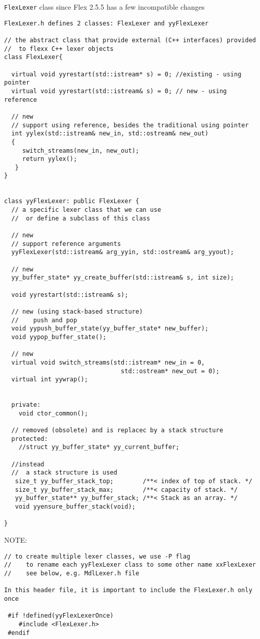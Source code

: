 \verb!FlexLexer! class since Flex 2.5.5 has a few incompatible changes
\begin{verbatim}
FlexLexer.h defines 2 classes: FlexLexer and yyFlexLexer

// the abstract class that provide external (C++ interfaces) provided
//  to flexx C++ lexer objects
class FlexLexer{

  virtual void yyrestart(std::istream* s) = 0; //existing - using pointer
  virtual void yyrestart(std::istream& s) = 0; // new - using reference
  
  // new
  // support using reference, besides the traditional using pointer
  int yylex(std::istream& new_in, std::ostream& new_out)
  {
     switch_streams(new_in, new_out);
     return yylex();
   }
}


class yyFlexLexer: public FlexLexer {
  // a specific lexer class that we can use
  //  or define a subclass of this class
  
  // new 
  // support reference arguments
  yyFlexLexer(std::istream& arg_yyin, std::ostream& arg_yyout);
  
  // new
  yy_buffer_state* yy_create_buffer(std::istream& s, int size);
  
  void yyrestart(std::istream& s);
  
  // new (using stack-based structure)
  //    push and pop
  void yypush_buffer_state(yy_buffer_state* new_buffer);
  void yypop_buffer_state();
  
  // new
  virtual void switch_streams(std::istream* new_in = 0,
                                std::ostream* new_out = 0);
  virtual int yywrap();
  
  
  private:
    void ctor_common();
  
  // removed (obsolete) and is replacec by a stack structure
  protected:
    //struct yy_buffer_state* yy_current_buffer;   
    
  //instead
  //  a stack structure is used
   size_t yy_buffer_stack_top;        /**< index of top of stack. */
   size_t yy_buffer_stack_max;        /**< capacity of stack. */
   yy_buffer_state** yy_buffer_stack; /**< Stack as an array. */
   void yyensure_buffer_stack(void);
    
}

\end{verbatim}

NOTE:
\begin{verbatim}
// to create multiple lexer classes, we use -P flag
//    to rename each yyFlexLexer class to some other name xxFlexLexer
//    see below, e.g. MdlLexer.h file

In this header file, it is important to include the FlexLexer.h only once

 #if !defined(yyFlexLexerOnce)
    #include <FlexLexer.h>
 #endif
\end{verbatim}


